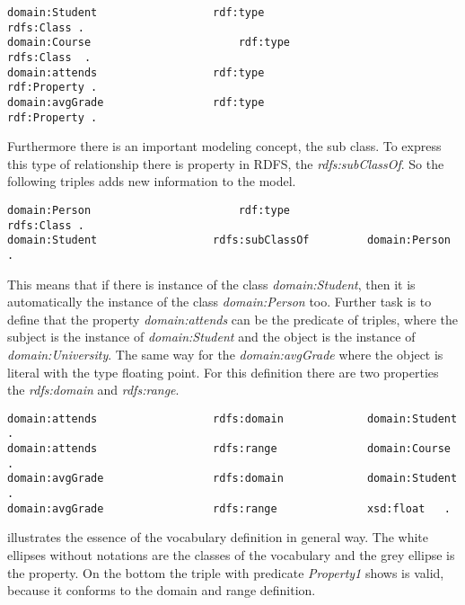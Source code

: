 \begin{lstlisting}[basicstyle=\footnotesize, captionpos=b, caption=Class definition, label=lst:sparql,
frame=single]
domain:Student					rdf:type						rdfs:Class .
domain:Course						rdf:type						rdfs:Class	.
domain:attends					rdf:type						rdf:Property .
domain:avgGrade					rdf:type						rdf:Property .
\end{lstlisting}

Furthermore there is an important modeling concept, the sub class. To express this type of relationship there is property in RDFS, the \textit{rdfs:subClassOf}. So the following triples adds new information to the model.

\begin{lstlisting}[basicstyle=\footnotesize, captionpos=b, caption=Class definition, label=lst:sparql,
frame=single]
domain:Person						rdf:type						rdfs:Class .
domain:Student					rdfs:subClassOf			domain:Person .
\end{lstlisting}

This means that if there is instance of the class \textit{domain:Student}, then it is automatically the instance of the class \textit{domain:Person} too. Further task is to define that the property \textit{domain:attends} can be the predicate of triples, where the subject is the instance of \textit{domain:Student} and the object is the instance of \textit{domain:University}. The same way for the \textit{domain:avgGrade} where the object is literal with the type floating point. For this definition there are two properties the \textit{rdfs:domain} and \textit{rdfs:range}.

\begin{lstlisting}[basicstyle=\footnotesize, captionpos=b, caption=Property definition I., label=lst:sparql,
frame=single]
domain:attends					rdfs:domain				domain:Student	.
domain:attends					rdfs:range				domain:Course .
domain:avgGrade					rdfs:domain				domain:Student	.
domain:avgGrade					rdfs:range				xsd:float	.
\end{lstlisting}

 illustrates the essence of the vocabulary definition in general way. The white ellipses without notations are the classes of the vocabulary and the grey ellipse is the property. On the bottom the triple with predicate \textit{Property1} shows is valid, because it conforms to the domain and range definition.






